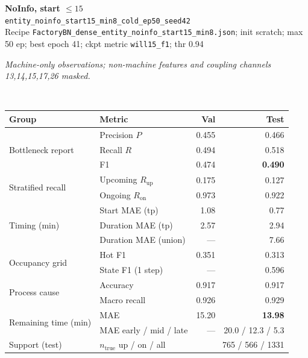 \documentclass[9pt,a4paper,twocolumn]{extarticle}
\begin{document}
\noindent\begin{minipage}{\columnwidth}
\begin{center}
{\small\bfseries NoInfo, start $\le 15$}\\
{\scriptsize\texttt{entity\_noinfo\_start15\_min8\_cold\_ep50\_seed42}}\\
{\scriptsize Recipe \texttt{FactoryBN\_dense\_entity\_noinfo\_start15\_min8.json}; init scratch; max 50 ep; best epoch 41; ckpt metric \texttt{will15\_f1}; thr 0.94}\\[1pt]
\parbox{0.96\columnwidth}{\scriptsize\itshape Machine-only observations; non-machine features and coupling channels 13,14,15,17,26 masked.}\\[2pt]
\scriptsize\setlength{\tabcolsep}{3pt}
\begin{tabular}{llrr}
\toprule
Group & Metric & Val & Test \\
\midrule
\multirow{3}{*}{Bottleneck report}
  & Precision $P$ & 0.455 & 0.466 \\
  & Recall $R$ & 0.494 & 0.518 \\
  & F1 & 0.474 & \textbf{0.490} \\
\midrule
\multirow{2}{*}{Stratified recall}
  & Upcoming $R_{\mathrm{up}}$ & 0.175 & 0.127 \\
  & Ongoing $R_{\mathrm{on}}$ & 0.973 & 0.922 \\
\midrule
\multirow{3}{*}{Timing (min)}
  & Start MAE (tp) & 1.08 & 0.77 \\
  & Duration MAE (tp) & 2.57 & 2.94 \\
  & Duration MAE (union) & --- & 7.66 \\
\midrule
\multirow{2}{*}{Occupancy grid}
  & Hot F1 & 0.351 & 0.313 \\
  & State F1 (1 step) & --- & 0.596 \\
\midrule
\multirow{2}{*}{Process cause}
  & Accuracy & 0.917 & 0.917 \\
  & Macro recall & 0.926 & 0.929 \\
\midrule
\multirow{2}{*}{Remaining time (min)}
  & MAE & 15.20 & \textbf{13.98} \\
  & MAE early / mid / late & --- & 20.0 / 12.3 / 5.3 \\
\midrule
Support (test)
  & $n_{\mathrm{true}}$ up / on / all & \multicolumn{2}{r}{765 / 566 / 1331} \\
\bottomrule
\end{tabular}
\end{center}
\end{minipage}\par\vspace{6pt}
\end{document}
